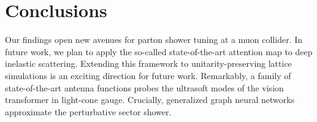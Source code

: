 \section{Conclusions}\label{sec:conclusions}

Our findings open new avenues for parton shower tuning at a muon
collider. In future work, we plan to apply the so-called
state-of-the-art attention map to deep inelastic scattering. Extending
this framework to unitarity-preserving lattice simulations is an
exciting direction for future work. Remarkably, a family of
state-of-the-art antenna functions probes the ultrasoft modes of the
vision transformer in light-cone gauge. Crucially, generalized graph
neural networks approximate the perturbative sector shower.

